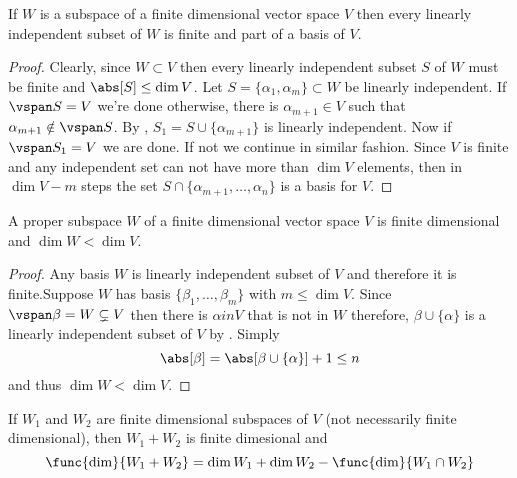 \begin{theorem}
    If \(W\) is a subspace of a finite dimensional vector space \(V\) then every linearly independent subset of \(W\) is finite and part of a basis of \(V\).
\end{theorem}

\begin{proof}
    Clearly, since \(W \subset V\) then every linearly independent subset \(S\) of \(W\) must be finite and \(\abs[S] \leq \dim V\). Let \(S = \{\alpha_1, \alpha_m\} \subset W\) be linearly independent. If \(\vspan S = V\) we're done otherwise, there is \(\alpha_{m+1} \in V\) such that \(\alpha_{m+1} \notin \vspan S\). By , \(S_1 = S \cup \{\alpha_{m+1}\}\) is linearly independent. Now if \(\vspan S_1 = V\) we are done. If not we continue in similar fashion. Since \(V\) is finite and any independent set can not have more than \(\dim V\) elements, then in \(\dim V - m\) steps the set \(S \cap \{\alpha_{m+1}, \dots , \alpha_n\}\) is a basis for \(V\).
\end{proof}

\begin{corollary}
    A proper subspace \(W\) of a finite dimensional vector space \(V\) is finite dimensional and \(\dim W < \dim V\).
\end{corollary}

\begin{proof}
    Any basis \(W\) is linearly independent subset of \(V\) and therefore it is finite.Suppose \(W\) has basis \(\{\beta_1, \dots , \beta_m\}\) with \(m \leq \dim V\). Since \(\vspan \beta = W \subsetneq V\) then there is  \(\alpha in V\) that is not in \(W\) therefore, \(\beta \cup \{\alpha\}\) is a linearly independent subset of \(V\) by . Simply
    \begin{equation*}
        \abs[\beta] = \abs[\beta \cup \{\alpha\}] + 1 \leq n
    \end{equation*}
    and thus \(\dim W < \dim V\).
\end{proof}

\begin{theorem}
    If \(W_1\) and \(W_2\) are finite dimensional subspaces of \(V\) (not necessarily finite dimensional), then \(W_1 + W_2\) is finite dimesional and
    \begin{equation*}
        \func{\dim}{W_1 + W_2} = \dim W_1 + \dim W_2 - \func{\dim}{W_1 \cap W_2}
    \end{equation*}
\end{theorem}

